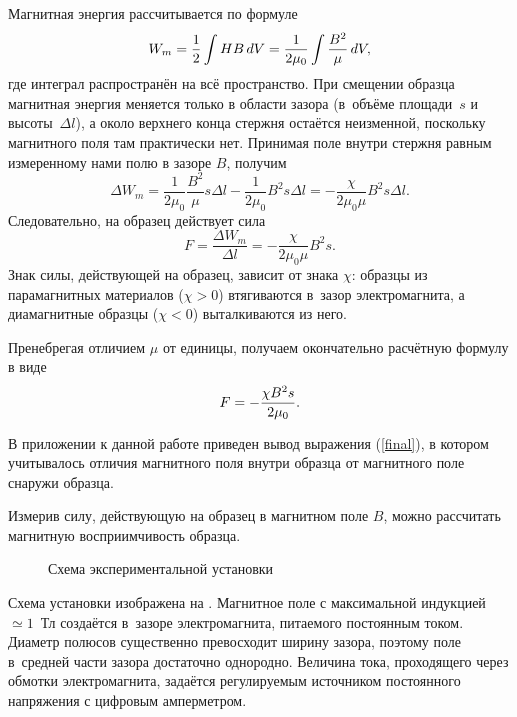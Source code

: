 Магнитная энергия рассчитывается по формуле
\begin{equation}%
	\eqmark{energy}
	W_m=\frac12\int H B\,dV=\frac{1}{2\mu_0}\int\frac{B^2}{\mu}\,dV,
\end{equation}
где интеграл распространён на всё пространство. При смещении образца магнитная энергия меняется только в области зазора
(в~объёме площади~$s$ и высоты~$\Delta l$), а около верхнего конца стержня остаётся неизменной, поскольку магнитного поля там
практически нет. Принимая поле внутри стержня равным измеренному нами полю в зазоре $B$, получим
\begin{equation*}
	\Delta W_m=\frac{1}{2\mu_0}\frac{B^2}{\mu}s\Delta l-\frac{1}{2\mu_0}B^2 s\Delta l=-\frac{\chi}{2\mu_0\mu}B^2s\Delta l.
\end{equation*}
Следовательно, на образец действует сила
\begin{equation}%
	F=\frac{\Delta W_m}{\Delta l}=-\frac{\chi}{2\mu_0\mu}B^2s.
\end{equation}
Знак силы, действующей на образец, зависит от знака $\chi$: образцы из парамагнитных материалов ($\chi>0$) втягиваются
в~зазор электромагнита, а диамагнитные образцы ($\chi<0$) выталкиваются  из него.

Пренебрегая отличием $\mu$ от единицы, получаем окончательно расчётную формулу в виде
\begin{equation}%
	\eqmark{final}
	F=-\frac{\chi B^2s}{2\mu_0}.
\end{equation}

В приложении к данной работе приведен вывод выражения (\eqref{final}), в котором учитывалось отличия магнитного поля внутри образца от магнитного поле снаружи образца.

Измерив силу, действующую на образец в магнитном поле $B$, можно рассчитать магнитную восприимчивость образца.

\begin{figure}%
	\caption{Схема экспериментальной установки}
\end{figure}


\experiment

Схема установки изображена на . Магнитное поле с максимальной индукцией~${\simeq}1$~Тл создаётся в~зазоре
электромагнита, питаемого постоянным током. Диаметр полюсов существенно превосходит ширину зазора, поэтому поле
в~средней части зазора достаточно однородно. Величина тока, проходящего  через обмотки электромагнита, 
задаётся регулируемым источником постоянного напряжения с цифровым амперметром.

